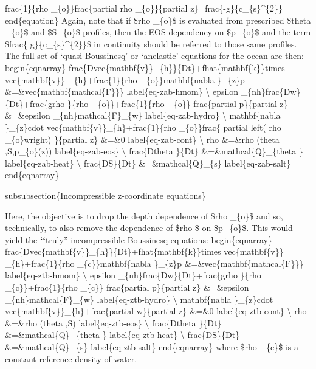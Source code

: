 \documentclass[letterpaper,10pt,english]{sphinxmanual}
\begin{document}
frac\{1\}\{rho \_\{o\}\}frac\{partial rho \_\{o\}\}\{partial z\}=frac\{-g\}\{c\_\{s\}\textasciicircum{}\{2\}\}
end\{equation\}
Again, note that if \$rho \_\{o\}\$ is evaluated from prescribed \$theta \_\{o\}\$
and \$S\_\{o\}\$ profiles, then the EOS dependency on \$p\_\{o\}\$ and the term \$frac\{
g\}\{c\_\{s\}\textasciicircum{}\{2\}\}\$ in continuity should be referred to those same profiles. The
full set of {\color{red}\bfseries{}{}`}quasi-Boussinesq' or {\color{red}\bfseries{}{}`}anelastic' equations for the ocean are
then:
begin\{eqnarray\}
frac\{Dvec\{mathbf\{v\}\}\_\{h\}\}\{Dt\}+fhat\{mathbf\{k\}\}times vec\{mathbf\{v\}\}
\_\{h\}+frac\{1\}\{rho \_\{o\}\}mathbf\{nabla \}\_\{z\}p \&=\&vec\{mathbf\{mathcal\{F\}\}\}
label\{eq-zab-hmom\} \textbackslash{}
epsilon \_\{nh\}frac\{Dw\}\{Dt\}+frac\{grho \}\{rho \_\{o\}\}+frac\{1\}\{rho \_\{o\}\}
frac\{partial p\}\{partial z\} \&=\&epsilon \_\{nh\}mathcal\{F\}\_\{w\}
label\{eq-zab-hydro\} \textbackslash{}
mathbf\{nabla \}\_\{z\}cdot vec\{mathbf\{v\}\}\_\{h\}+frac\{1\}\{rho \_\{o\}\}frac\{
partial left( rho \_\{o\}wright) \}\{partial z\} \&=\&0  label\{eq-zab-cont\} \textbackslash{}
rho \&=\&rho (theta ,S,p\_\{o\}(z))  label\{eq-zab-eos\} \textbackslash{}
frac\{Dtheta \}\{Dt\} \&=\&mathcal\{Q\}\_\{theta \}  label\{eq-zab-heat\} \textbackslash{}
frac\{DS\}\{Dt\} \&=\&mathcal\{Q\}\_\{s\}  label\{eq-zab-salt\}
end\{eqnarray\}

subsubsection\{Incompressible z-coordinate equations\}

Here, the objective is to drop the depth dependence of \$rho \_\{o\}\$ and so,
technically, to also remove the dependence of \$rho \$ on \$p\_\{o\}\$. This would
yield the {\color{red}\bfseries{}{}`{}`}truly'' incompressible Boussinesq equations:
begin\{eqnarray\}
frac\{Dvec\{mathbf\{v\}\}\_\{h\}\}\{Dt\}+fhat\{mathbf\{k\}\}times vec\{mathbf\{v\}\}
\_\{h\}+frac\{1\}\{rho \_\{c\}\}mathbf\{nabla \}\_\{z\}p \&=\&vec\{mathbf\{mathcal\{F\}\}\}
label\{eq-ztb-hmom\} \textbackslash{}
epsilon \_\{nh\}frac\{Dw\}\{Dt\}+frac\{grho \}\{rho \_\{c\}\}+frac\{1\}\{rho \_\{c\}\}
frac\{partial p\}\{partial z\} \&=\&epsilon \_\{nh\}mathcal\{F\}\_\{w\}
label\{eq-ztb-hydro\} \textbackslash{}
mathbf\{nabla \}\_\{z\}cdot vec\{mathbf\{v\}\}\_\{h\}+frac\{partial w\}\{partial z\}
\&=\&0  label\{eq-ztb-cont\} \textbackslash{}
rho \&=\&rho (theta ,S)  label\{eq-ztb-eos\} \textbackslash{}
frac\{Dtheta \}\{Dt\} \&=\&mathcal\{Q\}\_\{theta \}  label\{eq-ztb-heat\} \textbackslash{}
frac\{DS\}\{Dt\} \&=\&mathcal\{Q\}\_\{s\}  label\{eq-ztb-salt\}
end\{eqnarray\}
where \$rho \_\{c\}\$ is a constant reference density of water.
\end{document}
